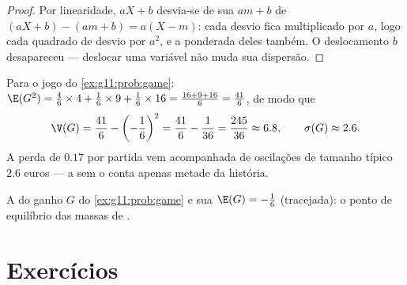 \begin{proof}
Por linearidade, $aX + b$ desvia-se de sua  $a m + b$ de
$(aX + b) - (am + b) = a(X - m)$: cada desvio fica multiplicado por $a$,
logo cada quadrado de desvio por $a^2$, e a  ponderada deles também.
O deslocamento $b$ desapareceu --- deslocar uma variável não muda sua
dispersão.
\end{proof}

\begin{example}\label{ex:g11:prob:variance}
Para o jogo do \cref{ex:g11:prob:game}:
$\E(G^2) = \frac46 \times 4 + \frac16 \times 9 + \frac16 \times 16
= \frac{16 + 9 + 16}{6} = \frac{41}{6}$, de modo que
\[
\V(G) = \frac{41}{6} - \left(-\frac16\right)^2
= \frac{41}{6} - \frac{1}{36} = \frac{245}{36} \approx 6.8,
\qquad
\sigma(G) \approx 2.6 .
\]
A perda  de $0.17$ por partida vem acompanhada de oscilações de
tamanho típico $2.6$ euros --- a  sem o  conta
apenas metade da história.
\end{example}

\begin{omfigure}

{\small A  do ganho $G$ do \cref{ex:g11:prob:game} e sua
 $\E(G) = -\frac16$ (tracejada): o ponto de equilíbrio das
massas de .}
\end{omfigure}

\section{Exercícios}

